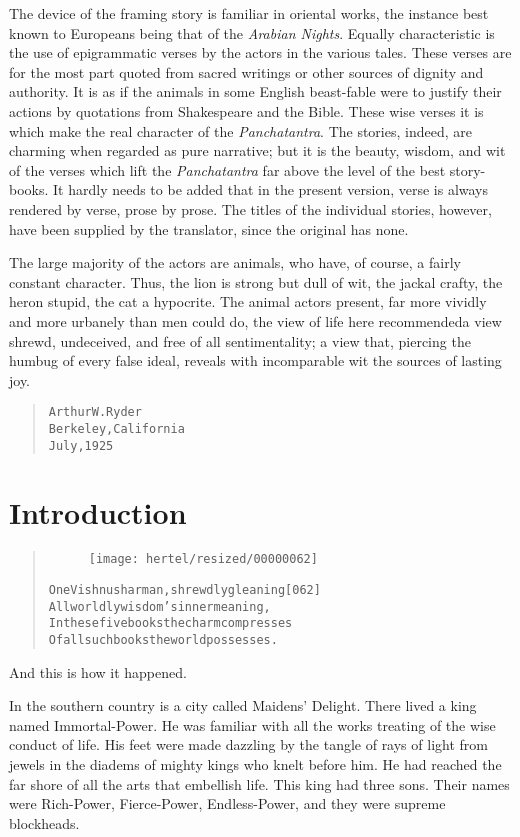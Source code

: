 \documentclass[article, twoside, 10pt]{memoir}
\renewenvironment{verbatim}{%
\begin{quote}%
\vskip -10pt%
\begin{alltt}\normalfont\small}{\end{alltt}%
\end{quote}%
\vskip -10pt
} %
\begin{document}
The device of the framing story is familiar in oriental works, the
instance best known to Europeans being that of the
\emph{Arabian Nights}. Equally characteristic is the use of
epigrammatic verses by the actors in the various tales. These
verses are for the most part quoted from sacred writings or other
sources of dignity and authority. It is as if the animals in some
English beast-fable were to justify their actions by quotations
from Shakespeare and the Bible. These wise verses it is which make
the real character of the \emph{Panchatantra}. The stories, indeed,
are charming when regarded as pure narrative; but it is the beauty,
wisdom, and wit of the verses which lift the \emph{Panchatantra}
far above the level of the best story-books. It hardly needs to be
added that in the present version, verse is always rendered by
verse, prose by prose. The titles of the individual stories,
however, have been supplied by the translator, since the original
has none.

The large majority of the actors are animals, who have, of course,
a fairly constant character. Thus, the lion is strong but dull of
wit, the jackal crafty, the heron stupid, the cat a hypocrite. The
animal actors present, far more vividly and more urbanely than men
could do, the view of life here recommended{\textemdash}a view shrewd,
undeceived, and free of all sentimentality; a view that, piercing
the humbug of every false ideal, reveals with incomparable wit the
sources of lasting joy.

\begin{verbatim}
                            Arthur W. Ryder
                            Berkeley, California
                            July, 1925
\end{verbatim}
\chapter{Introduction}

\begin{verbatim}
\begin{figure}[p]\texttt{[image: hertel/resized/00000062]}\end{figure}One Vishnusharman, shrewdly gleaning                    [062]
All worldly wisdom's inner meaning,
In these five books the charm compresses
Of all such books the world possesses.
\end{verbatim}
And this is how it happened.

In the southern country is a city called Maidens' Delight. There
lived a king named Immortal-Power. He was familiar with all the
works treating of the wise conduct of life. His feet were made
dazzling by the tangle of rays of light from jewels in the diadems
of mighty kings who knelt before him. He had reached the far shore
of all the arts that embellish life. This king had three sons.
Their names were Rich-Power, Fierce-Power, Endless-Power, and they
were supreme blockheads.
\end{document}
